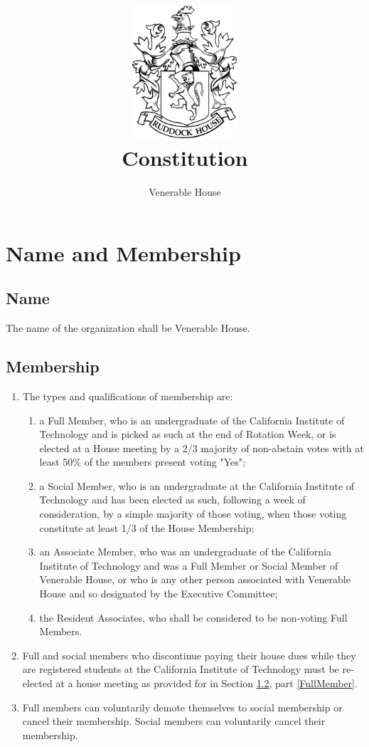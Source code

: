 \documentclass[10pt]{article} %
\title{\includegraphics[width=1.55in]{venerable_crest.png} \\ Constitution}
\author{Venerable House}
\begin{document}
\maketitle

\section{Name and Membership}
\subsection{Name}
The name of the organization shall be Venerable House.
\subsection{Membership}
\label{Membership}
\begin{enumerate}
\item The types and qualifications of membership are:
\begin{enumerate}
\item \label{FullMember} a Full Member, who is an undergraduate of the California Institute of Technology and is picked as such at the end of Rotation Week, or is elected at a House meeting by a 2/3 majority of non-abstain votes with at least 50\% of the members present voting "Yes";
\item a Social Member, who is an undergraduate at the California Institute of Technology and has been elected as such, following a week of consideration, by a simple majority of those voting, when those voting constitute at least 1/3 of the House Membership;
\item an Associate Member, who was an undergraduate of the California Institute of Technology and was a Full Member or Social Member of Venerable House, or who is any other person associated with Venerable House and so designated by the Executive Committee;
\item the Resident Associates, who shall be considered to be non-voting Full Members.
\end{enumerate}
\item Full and social members who discontinue paying their house dues while they are registered students at the California Institute of Technology must be re-elected at a house meeting as provided for in Section \ref{Membership}, part \ref{FullMember}.
\item Full members can voluntarily demote themselves to social membership or cancel their membership. Social members can voluntarily cancel their membership.
\end{enumerate}
\end{document}
